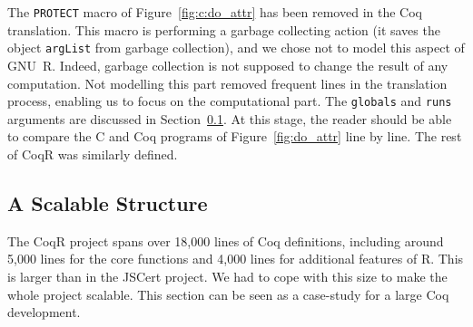 \documentclass[
    sigplan,
    10pt,
    review, %
    natbib=false %
 ]{acmart}
\begin{document}
The \texttt{PROTECT} macro of Figure~\ref{fig:c:do_attr}
has been removed in the Coq translation.
This macro is performing a garbage collecting action
(it saves the object \texttt{argList} from garbage collection),
and we chose not to model this aspect of GNU~R.
Indeed, garbage collection is not supposed to change the result of any computation.
Not modelling this part removed frequent lines in the translation process,
enabling us to focus on the computational part.
%
The \texttt{globals} and \texttt{runs} arguments
are discussed in Section~\ref{sec:coq:structure}.
%
At this stage, the reader should be able
to compare the C and Coq programs of Figure~\ref{fig:do_attr}
line by line.
The rest of CoqR was similarly defined.

\subsection{A Scalable Structure}
\label{sec:coq:structure}

The CoqR project spans over 18,000 lines of Coq definitions,
including around 5,000 lines for the core functions
and 4,000 lines for additional features of R.
This is larger than in the JSCert project.
We had to cope with this size to make the whole project scalable.
This section can be seen as a case-study for a large Coq development.
\end{document}
